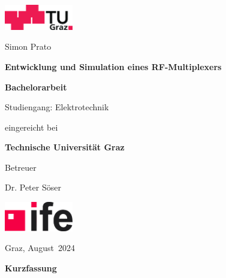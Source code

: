 \documentclass[11pt]{article}
\begin{document}
{}

\begin{titlepage}	
	{\sffamily		
		\begin{center}			
			\includegraphics[width=30mm]{images/TU_Graz_Logo.png}
			
			\vfill\vfill\vfill
			\vfill\vfill\vfill
			
			{Simon Prato}
			
			\vfill\vfill\vfill
			
			{\LARGE\bfseries{Entwicklung und Simulation eines RF-Multiplexers}}
			
			\vfill\vfill\vfill
			\vfill\vfill\vfill			
			
			{\bfseries\large{Bachelorarbeit}}
			
			{Studiengang: {Elektrotechnik}}
						
			\vfill\vfill\vfill			
			
			eingereicht bei
			
			\vfill
			
			{\bfseries\large{Technische Universität Graz}}			
			
			\vfill\vfill\vfill			
			
			Betreuer
			
			{Dr. Peter Söser}
			
			\vfill
			
			\vfill
			
			\includegraphics[width=30mm]{images/IFE_Logo.png}
			
					
			\vfill\vfill\vfill
					
			{Graz}, {August}~{2024}
			
		\end{center}
	}%
\end{titlepage}

\newpage

\iftrue
\cleardoublepage
\setcounter{page}{2}
\vspace*{2.2 cm}
{\Large
\noindent
{\bf Kurzfassung}} \\
\vspace*{0.3 cm}
\end{document}
